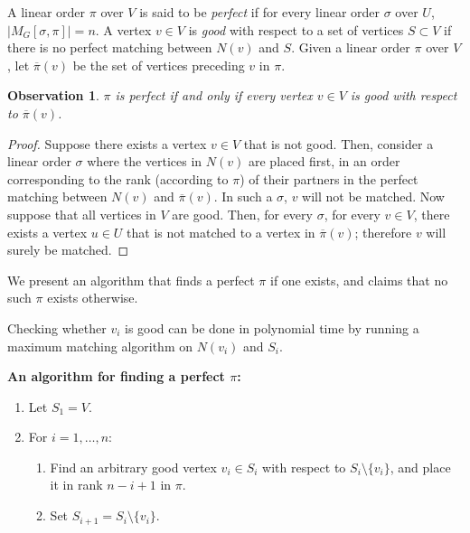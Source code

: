 \documentclass{toc}
\theoremstyle{plain}
\newtheorem{observation}[theorem]{Observation}
\newcommand{\precvpi}{\overline{\pi}(v)}
\begin{document}
%

A linear order $\pi$ over $V$ is said to be \emph{perfect} if for every linear order $\sigma$ over $U$, $|M_G[\sigma,\pi]| = n$.
A vertex $v \in V$ is \emph{good} with respect to a set of vertices $S \subset V$ if there is no perfect matching between $N(v)$ and $S$.
Given a linear order $\pi$ over $V$, let $\precvpi$ be the set of vertices preceding $v$ in $\pi$.

\begin{observation}
	\label{obs:perfect-pi}
	$\pi$ is perfect if and only if every vertex $v \in V$ is good with respect to $\precvpi$.
\end{observation}
\begin{proof}
	Suppose there exists a vertex $v \in V$ that is not good. Then, consider a linear order $\sigma$ where the vertices in $N(v)$ are placed first, in an order corresponding to the rank (according to $\pi$) of their partners in the perfect matching between $N(v)$ and $\precvpi$. In such a $\sigma$, $v$ will not be matched.
	Now suppose that all vertices in $V$ are good.
	Then, for every $\sigma$, for every $v \in V$, there exists a vertex $u \in U$ that is not matched to a vertex in $\precvpi$; therefore $v$ will surely be matched.	
\end{proof}


We present an algorithm that finds a perfect $\pi$ if one exists, and claims that no such $\pi$ exists otherwise.

Checking whether $v_i$ is good can be done in polynomial time by running a maximum matching algorithm on $N(v_i)$ and $S_i$.

\medskip
\noindent\textbf{An algorithm for finding a perfect $\pi$:}
\begin{enumerate}
	\item Let $S_1=V$.
%
%
\item For $i=1,\ldots,n$:    %
	\begin{enumerate}
		\item Find an arbitrary good vertex $v_i \in S_i$ with respect to $S_i \setminus \{v_i\}$, and place it in rank $n-i+1$ in $\pi$.
		\item Set $S_{i+1}=S_i \setminus \{v_i\}$.
	\end{enumerate}
\end{enumerate}
\end{document}
